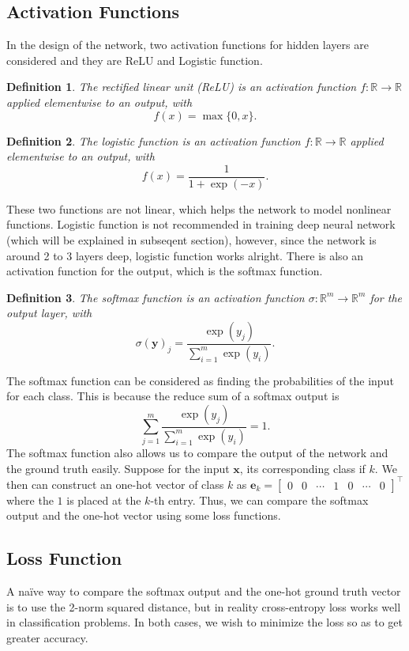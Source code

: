 \documentclass[12pt]{article}
\newtheorem{definition}{Definition}
\theoremstyle{remark}
\newcommand{\R}{\mathbb{R}}
\newcommand{\mat}[1]{\mathbf{#1}}
\begin{document}
\subsection{Activation Functions}
In the design of the network, two activation functions for hidden layers are considered and they are ReLU and Logistic function.
\begin{definition}
	The rectified linear unit (ReLU) is an activation function \(f: \R \to \R\) applied elementwise to an output, with
	\[
		f(x) = \max\{0, x\}.
	\]
\end{definition}
\begin{definition}
	The logistic function is an activation function \(f: \R \to \R\) applied elementwise to an output, with
	\[
		f(x) = \frac{1}{1+\exp(-x)}.
	\]
\end{definition}

These two functions are not linear, which helps the network to model nonlinear functions. Logistic function is not recommended in training deep neural network (which will be explained in subseqent section), however, since the network is around 2 to 3 layers deep, logistic function works alright. There is also an activation function for the output, which is the softmax function.
\begin{definition}
	The softmax function is an activation function \(\sigma: \R^m \to \R^m\) for the output layer, with
	\[
		\sigma(\mat y)_j = \frac{\exp(y_j)}{\sum_{i=1}^m \exp(y_i)}.
	\]
\end{definition}

The softmax function can be considered as finding the probabilities of the input for each class. This is because the reduce sum of a softmax output is \[
	\sum_{j=1}^m 	\frac{\exp(y_j)}{\sum_{i=1}^m \exp(y_i)} = 1.
\]
The softmax function also allows us to compare the output of the network and the ground truth easily. Suppose for the input \(\mat x\), its corresponding class if \(k\). We then can construct an one-hot vector of class \(k\) as \(\mat e_k = \begin{bmatrix}
	0 & 0 & \cdots & 1 & 0 & \cdots & 0
\end{bmatrix}^\intercal\) where the \(1\) is placed at the \(k\)-th entry. Thus, we can compare the softmax output and the one-hot vector using some loss functions.

\subsection{Loss Function}
A na\"ive way to compare the softmax output and the one-hot ground truth vector is to use the 2-norm squared distance, but in reality cross-entropy loss works well in classification problems. In both cases, we wish to minimize the loss so as to get greater accuracy.
\end{document}
